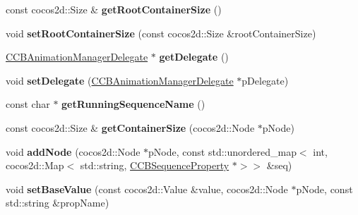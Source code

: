 \begin{DoxyCompactItemize}
const cocos2d\+::\+Size \& {\bfseries get\+Root\+Container\+Size} ()
\item 
\mbox{\label{classcocosbuilder_1_1CCBAnimationManager_a50976a59732f34be12d59499831480a3}} 
void {\bfseries set\+Root\+Container\+Size} (const cocos2d\+::\+Size \&root\+Container\+Size)
\item 
\mbox{\label{classcocosbuilder_1_1CCBAnimationManager_a829a95ff466e0d8f85e92974e3a1988d}} 
\hyperlink{classcocosbuilder_1_1CCBAnimationManagerDelegate}{C\+C\+B\+Animation\+Manager\+Delegate} $\ast$ {\bfseries get\+Delegate} ()
\item 
\mbox{\label{classcocosbuilder_1_1CCBAnimationManager_a961f423d4fbd5f851b3a3e8aa97a35a0}} 
void {\bfseries set\+Delegate} (\hyperlink{classcocosbuilder_1_1CCBAnimationManagerDelegate}{C\+C\+B\+Animation\+Manager\+Delegate} $\ast$p\+Delegate)
\item 
\mbox{\label{classcocosbuilder_1_1CCBAnimationManager_a9743ece599723ac740227ca050ffb10d}} 
const char $\ast$ {\bfseries get\+Running\+Sequence\+Name} ()
\item 
\mbox{\label{classcocosbuilder_1_1CCBAnimationManager_a9394a1b04520770b83afef3eb0332925}} 
const cocos2d\+::\+Size \& {\bfseries get\+Container\+Size} (cocos2d\+::\+Node $\ast$p\+Node)
\item 
\mbox{\label{classcocosbuilder_1_1CCBAnimationManager_adbc5bd93938295d8868d0dd2178619a2}} 
void {\bfseries add\+Node} (cocos2d\+::\+Node $\ast$p\+Node, const std\+::unordered\+\_\+map$<$ int, cocos2d\+::\+Map$<$ std\+::string, \hyperlink{classcocosbuilder_1_1CCBSequenceProperty}{C\+C\+B\+Sequence\+Property} $\ast$$>$$>$ \&seq)
\item 
\mbox{\label{classcocosbuilder_1_1CCBAnimationManager_abcae4b2b3d0b527effa0413815116bff}} 
void {\bfseries set\+Base\+Value} (const cocos2d\+::\+Value \&value, cocos2d\+::\+Node $\ast$p\+Node, const std\+::string \&prop\+Name)
\item 

\end{DoxyCompactItemize}
